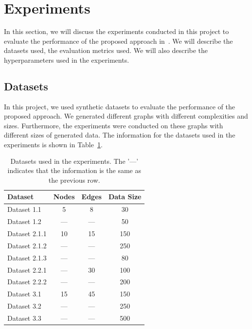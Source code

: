 \documentclass{lxaiproposal}
\begin{document}
    \section{Experiments}\label{sec:experiments}
    \vspace*{-3mm}

    In this section, we will discuss the experiments conducted in this project to evaluate the performance of the proposed
    approach in~\cite{deleu2022daggflownet}. We will describe the datasets used, the evaluation metrics used. We will
    also describe the hyperparameters used in the experiments.

    \subsection{Datasets}
    \vspace*{-3mm}

    In this project, we used synthetic datasets to evaluate the performance of the proposed approach. We generated
    different graphs with different complexities and sizes. Furthermore, the experiments were conducted on these
    graphs with different sizes of generated data. The information for the datasets used in the experiments is shown in
    Table~\ref{tab:datasets}.

    \begin{table}[h]
        \centering
        \begin{tabular}{|l|c|c|c|}
            \hline
            \textbf{Dataset} & \textbf{Nodes} & \textbf{Edges} & \textbf{Data Size} \\
            \hline
            Dataset 1.1      & 5              & 8              & 30                 \\
            Dataset 1.2      & ---            & ---            & 50                 \\
            \hline
            Dataset 2.1.1    & 10             & 15             & 150                \\
            Dataset 2.1.2    & ---            & ---            & 250                \\
            Dataset 2.1.3    & ---            & ---            & 80                 \\
            \hline
            Dataset 2.2.1    & ---            & 30             & 100                \\
            Dataset 2.2.2    & ---            & ---            & 200                \\
            \hline
            Dataset 3.1      & 15             & 45             & 150                \\
            Dataset 3.2      & ---            & ---            & 250                \\
            Dataset 3.3      & ---            & ---            & 500                \\

            \hline
        \end{tabular}
        \caption{Datasets used in the experiments. The '---' indicates that the information is the same as the previous
        row.}
        \label{tab:datasets}
    \end{table}
\end{document}
